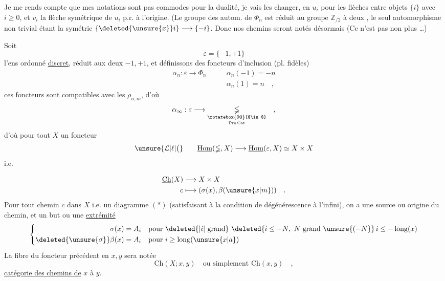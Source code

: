 Je me rends compte que mes notations  sont pas commodes pour la dualité, je vais les changer, en $u_i$ pour les flèches entre objets $\{i\}$ avec $i\geq0$,  et $v_i$ la flèche symétrique de $u_i$ p.r. à l'origine. (Le groupe des autom. de $\Phi_n$ est réduit au groupe $\mathbb Z_{/2}$ à deux , le seul automorphisme non trivial étant la symétrie $\{\deleted{\unsure{x}}i\}\longrightarrow\{-i\}$. Donc nos  chemins seront notés désormais
(Ce n'est pas non plus \ldots)

 Soit 
\[
\varepsilon=\{-1,+1\}
\]
l'ens ordonné \uline{discret}, réduit aux deux  $-1,+1$, et définissons des foncteurs d'inclusion (pl. fidèles)
\[
\begin{aligned}
\alpha_n:\varepsilon\longrightarrow\Phi_n\qquad &\alpha_n(-1)=-n\\
&\alpha_n(1)=n\quad,
\end{aligned}
\]
ces foncteurs sont compatibles avec les $\rho_{n,m}$, d'où
\[
\alpha_\infty:\varepsilon\longrightarrow\underset{\underset{\mathrm{Pro\,Cat}}{\rotatebox{90}{$\in$}}}{\mathbb{\Phi}}\quad,
\]
d'où pour tout $X$ un foncteur
\[
\unsure{\mathcal L|\ell|\bigl(}\qquad\underline{\mathrm{Hom}}(\mathbb{\Phi},X)\longrightarrow\underline{\mathrm{Hom}}(\varepsilon,X)\simeq X\times X
\]
i.e.

\[
\begin{aligned}
\underline{\mathrm{Ch}}(X)&\longrightarrow X\times X\\
c&\longmapsto(\sigma(x),\beta(\unsure{x|m}))\quad.
\end{aligned}
\]
Pour tout chemin $c$ dans $X$ i.e. un diagramme $(*)$ (satisfaisant à la condition de dégénérescence à l'infini), on a une source ou origine du chemin, et un but ou une \uline{extrémité}
\[
\left\{\begin{aligned}
\sigma(x)&=A_i\quad\text{pour }\deleted{|i|\ \text{grand}}\ \deleted{i\leq-N,\ N\ \text{grand}\ \unsure{(-N}}\,i\leq-\operatorname{long}(x)\\
\deleted{\unsure{\sigma}}\beta(x)&=A_i\quad\text{pour }i\geq\operatorname{long}(\unsure{x|a})
\end{aligned}\right.
\]
La fibre du  foncteur précédent en $x,y$ sera notée
\[
\underline{\mathrm{Ch}}(X;x,y)\quad\text{ou simplement }\underline{\mathrm{Ch}}(x,y)\quad,
\]
\uline{catégorie des chemins de} $x$ à $y$.

